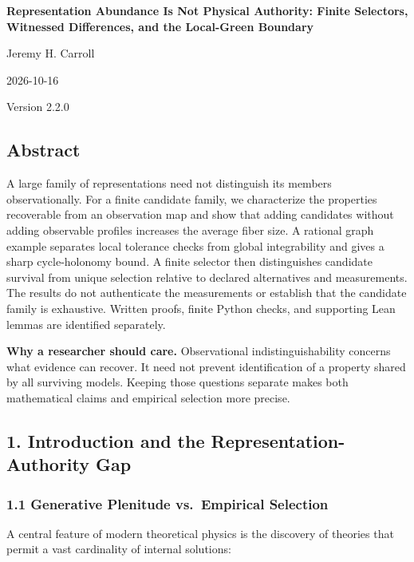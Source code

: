 \documentclass[
  10pt,
]{article}
\author{}
\date{}
\begin{document}
\begin{center}
{\LARGE\bfseries Representation Abundance Is Not Physical Authority: Finite Selectors,
Witnessed Differences, and the Local-Green Boundary\par}
Jeremy H. Carroll\par
2026-10-16\par
Version 2.2.0\par
\end{center}

\subsection{Abstract}\label{abstract}

A large family of representations need not distinguish its members observationally. For a finite candidate family, we characterize the properties recoverable from an observation map and show that adding candidates without adding observable profiles increases the average fiber size. A rational graph example separates local tolerance checks from global integrability and gives a sharp cycle-holonomy bound. A finite selector then distinguishes candidate survival from unique selection relative to declared alternatives and measurements. The results do not authenticate the measurements or establish that the candidate family is exhaustive. Written proofs, finite Python checks, and supporting Lean lemmas are identified separately.

\textbf{Why a researcher should care.} Observational indistinguishability concerns what evidence can recover. It need not prevent identification of a property shared by all surviving models. Keeping those questions separate makes both mathematical claims and empirical selection more precise.

\subsection{1. Introduction and the Representation-Authority Gap}\label{introduction-and-the-representation-authority-gap}

\subsubsection{1.1 Generative Plenitude vs.~Empirical Selection}\label{generative-plenitude-vs.-empirical-selection}

A central feature of modern theoretical physics is the discovery of theories that permit a vast cardinality of internal solutions:
\end{document}
